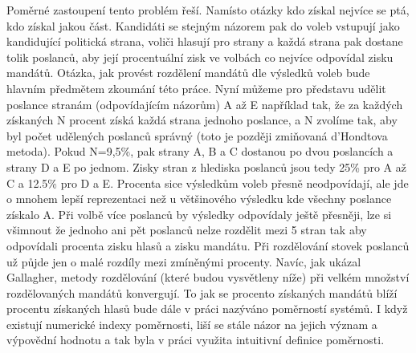 \documentclass[12pt]{report}
\begin{document}
Poměrné zastoupení tento problém řeší.
Namísto otázky kdo získal nejvíce se ptá, kdo získal jakou část.
Kandidáti se stejným názorem pak do voleb vstupují jako kandidující politická strana, voliči hlasují pro strany a každá strana pak dostane tolik poslanců, aby její procentuální zisk ve volbách co nejvíce odpovídal zisku mandátů.
Otázka, jak provést rozdělení mandátů dle výsledků voleb bude hlavním předmětem zkoumání této práce.
Nyní můžeme pro představu udělit poslance stranám (odpovídajícím názorům) A až E například tak, že za každých získaných N procent získá každá strana jednoho poslance, a N zvolíme tak, aby byl počet udělených poslanců správný (toto je později zmiňovaná d'Hondtova metoda).
Pokud N=9,5\%, pak strany A, B a C dostanou po dvou poslancích a strany D a E po jednom.
Zisky stran z hlediska poslanců jsou tedy 25\% pro A až C a 12.5\% pro D a E.
Procenta sice výsledkům voleb přesně neodpovídají, ale jde o mnohem lepší reprezentaci než u většinového výsledku kde všechny poslance získalo A.
Při volbě více poslanců by výsledky odpovídaly ještě přesněji, lze si všimnout že jednoho ani pět poslanců nelze  rozdělit mezi 5 stran tak aby odpovídali procenta zisku hlasů a zisku mandátu.
Při rozdělování stovek poslanců už půjde jen o malé rozdíly mezi zmíněnými procenty.
Navíc, jak ukázal Gallagher, metody rozdělování (které budou vysvětleny níže) při velkém množství rozdělovaných mandátů konvergují.\autocite{GAL1} To jak se procento získaných mandátů blíží procentu získaných hlasů bude dále v práci nazýváno poměrností systémů.
I když existují numerické indexy poměrnosti, liší se stále názor na jejich význam a výpovědní hodnotu a tak byla v práci využita intuitivní definice poměrnosti.\autocite{GAL2}
\end{document}
